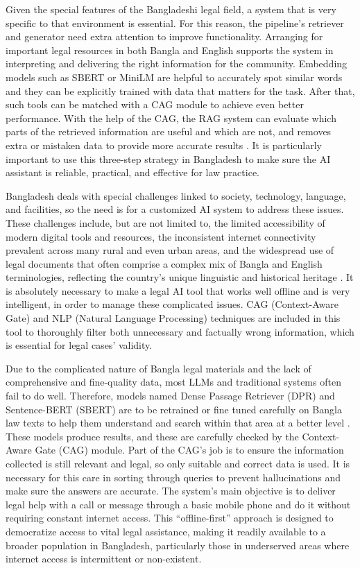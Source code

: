 Given the special features of the Bangladeshi legal field, a system that is very specific to that environment is essential. For this reason, the pipeline’s retriever and generator need extra attention to improve functionality. Arranging for important legal resources in both Bangla and English supports the system in interpreting and delivering the right information for the community. Embedding models such as SBERT or MiniLM are helpful to accurately spot similar words and they can be explicitly trained with data that matters for the task. After that, such tools can be matched with a CAG module to achieve even better performance. With the help of the CAG, the RAG system can evaluate which parts of the retrieved information are useful and which are not, and removes extra or mistaken data to provide more accurate results \cite{sanh2020distilbertdistilledversionbert}. It is particularly important to use this three-step strategy in Bangladesh to make sure the AI assistant is reliable, practical, and effective for law practice.

Bangladesh deals with special challenges linked to society, technology, language, and facilities, so the need is for a customized AI system to address these issues. These challenges include, but are not limited to, the limited accessibility of modern digital tools and resources, the inconsistent internet connectivity prevalent across many rural and even urban areas, and the widespread use of legal documents that often comprise a complex mix of Bangla and English terminologies, reflecting the country's unique linguistic and historical heritage \cite{mahfuz2024latetrainearlyuse}. It is absolutely necessary to make a legal AI tool that works well offline and is very intelligent, in order to manage these complicated issues. CAG (Context-Aware Gate) and NLP (Natural Language Processing) techniques are included in this tool to thoroughly filter both unnecessary and factually wrong information, which is essential for legal cases’ validity.

Due to the complicated nature of Bangla legal materials and the lack of comprehensive and fine-quality data, most LLMs and traditional systems often fail to do well. Therefore, models named Dense Passage Retriever (DPR) and Sentence-BERT (SBERT) are to be retrained or fine tuned carefully on Bangla law texts to help them understand and search within that area at a better level \cite{reimers2019sentencebertsentenceembeddingsusing}. These models produce results, and these are carefully checked by the Context-Aware Gate (CAG) module. Part of the CAG’s job is to ensure the information collected is still relevant and legal, so only suitable and correct data is used. It is necessary for this care in sorting through queries to prevent hallucinations and make sure the answers are accurate. The system’s main objective is to deliver legal help with a call or message through a basic mobile phone and do it without requiring constant internet access. This ``offline-first'' approach is designed to democratize access to vital legal assistance, making it readily available to a broader population in Bangladesh, particularly those in underserved areas where internet access is intermittent or non-existent.

